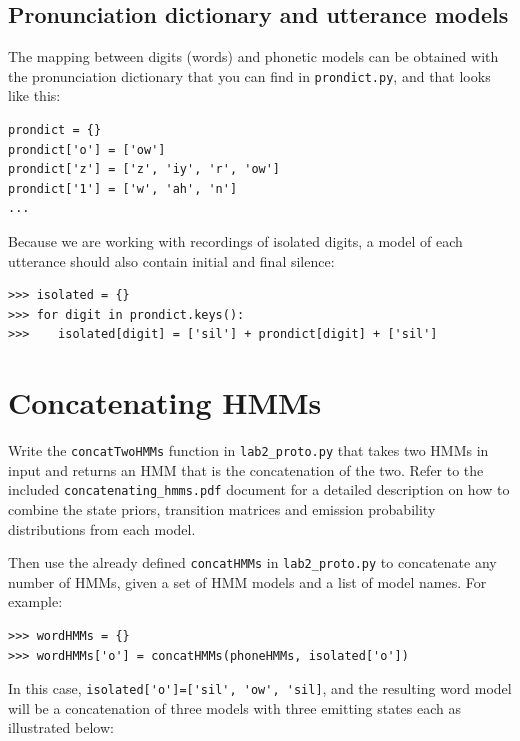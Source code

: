 \documentclass{nada-ten}
\begin{document}
\subsection{Pronunciation dictionary and utterance models}
\label{sec:word_models}
The mapping between digits (words) and phonetic models can be obtained with the pronunciation dictionary that you can find in \texttt{prondict.py}, and that looks like this:
\begin{verbatim}
prondict = {}
prondict['o'] = ['ow']
prondict['z'] = ['z', 'iy', 'r', 'ow']
prondict['1'] = ['w', 'ah', 'n']
...
\end{verbatim}

Because we are working with recordings of isolated digits, a model of each utterance should also contain initial and final silence:
\begin{verbatim}
>>> isolated = {}
>>> for digit in prondict.keys():
>>>    isolated[digit] = ['sil'] + prondict[digit] + ['sil']
\end{verbatim}

\section{Concatenating HMMs}
Write the \texttt{concatTwoHMMs} function in \texttt{lab2\_proto.py} that takes two HMMs in input and returns an HMM that is the concatenation of the two.
Refer to the included \texttt{concatenating\_hmms.pdf} document for a detailed description on how to combine the state priors, transition matrices and emission probability distributions from each model. 

Then use the already defined \texttt{concatHMMs} in \texttt{lab2\_proto.py} to concatenate any number of HMMs, given a set of HMM models and a list of model names. For example:

\begin{verbatim}
>>> wordHMMs = {}
>>> wordHMMs['o'] = concatHMMs(phoneHMMs, isolated['o'])
\end{verbatim}

In this case, \verb|isolated['o']=['sil', 'ow', 'sil]|, and the resulting word model will be a concatenation of three models with three emitting states each as illustrated below:
\end{document}
